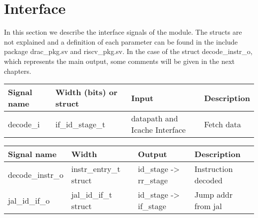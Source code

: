 \section{Interface}
\label{chapter 4}

In this section we describe the interface signals of the module. The structs are not explained and a definition of each parameter can be found in the include package drac\_pkg.sv and riscv\_pkg.sv. In the case of the struct decode\_instr\_o, which represents the main output, some comments will be given in the next chapters.

\begin{table}[H]
\centering
\begin{tabular}{l|l|l|p{3cm}}
\hline \hline
Signal name & Width (bits) or struct & Input & Description \\
\hline \hline
decode\_i & if\_id\_stage\_t & datapath and Icache Interface & Fetch data \\ 
\hline
\end{tabular}
\end{table}

\begin{table}[H]
\centering
\begin{tabular}{l|l|l|p{3cm}}
\hline \hline
Signal name & Width & Output & Description \\
\hline \hline
decode\_instr\_o & instr\_entry\_t struct & id\_stage -> rr\_stage & Instruction decoded \\
\hline
jal\_id\_if\_o & jal\_id\_if\_t struct & id\_stage -> if\_stage & Jump addr from jal \\
\hline
\end{tabular}
\end{table}